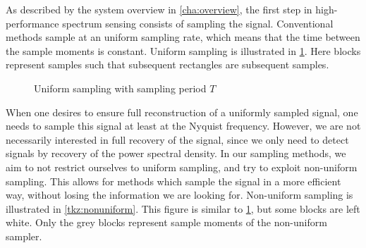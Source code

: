 \documentclass[a4paper, openany, oneside]{memoir}
\begin{document}
As described by the system overview in \cref{cha:overview}, the first step in high-performance spectrum sensing consists of sampling the signal. Conventional methods sample at an uniform sampling rate, which means that the time between the sample moments is constant. Uniform sampling is illustrated in \cref{tkz:uniform}. Here blocks represent samples such that subsequent rectangles are subsequent samples.

\begin{figure}[H]
\centering
{}
\caption{Uniform sampling with sampling period $T$}\label{tkz:uniform}
\end{figure}

When one desires to ensure full reconstruction of a uniformly sampled signal, one needs to sample this signal at least at the Nyquist frequency. However, we are not necessarily interested in full recovery of the signal, since we only need to detect signals by recovery of the power spectral density. In our sampling methods, we aim to not restrict ourselves to uniform sampling, and try to exploit non-uniform sampling. This allows for methods which sample the signal in a more efficient way, without losing the information we are looking for. Non-uniform sampling is illustrated in \cref{tkz:nonuniform}. This figure is similar to \cref{tkz:uniform}, but some blocks are left white. Only the grey blocks represent sample moments of the non-uniform sampler.
\end{document}
